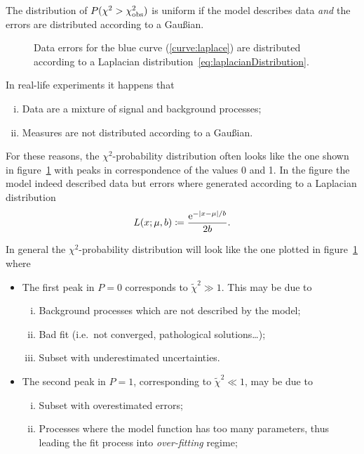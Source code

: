 The distribution of $P(\chi^2 > \chi^2_\textup{obs})$ is uniform if the model describes data \emph{and} the errors are distributed according to a Gau\ss{}ian.
\begin{figure}
	\centering
	\caption{Data errors for the blue curve (\ref{curve:laplace}) are distributed according to a Laplacian distribution~\eqref{eq:laplacianDistribution}.}
	\label{fig:chiSquareProbNonFlat}
\end{figure}
In real-life experiments it happens that
\begin{enumerate}[i.]
	\item
		Data are a mixture of signal and background processes;
	\item
		Measures are not distributed according to a Gau\ss{}ian.
\end{enumerate}
For these reasons, the $\chi^2$-probability distribution often looks like the one shown in figure~\ref{fig:chiSquareProbNonFlat} with peaks in correspondence of the values \num{0} and \num{1}.
In the figure the model indeed described data but errors where generated according to a Laplacian distribution
\begin{equation}\label{eq:laplacianDistribution}
	L(x;\mu,b) \coloneqq \frac{\mathrm{e}^{-\lvert x-\mu\rvert/b}}{2b}.
\end{equation}



In general the $\chi^2$-probability distribution will look like the one plotted in figure~\ref{fig:chiSquareProbNonFlat} where
\begin{itemize}
	\item
		The first peak in $P = 0$ corresponds to $\tilde\chi^2\gg1$.
		This may be due to
		\begin{enumerate}[i)]
			\item
				Background processes which are not described by the model;
			\item
				Bad fit (i.e.~not converged, pathological solutions\dots);
			\item
				Subset with underestimated uncertainties.
		\end{enumerate}
	\item
		The second peak in $P=1$, corresponding to $\tilde\chi^2\ll1$, may be due to
		\begin{enumerate}[i)]
			\item
				Subset with overestimated errors;
			\item
				Processes where the model function has too many parameters, thus leading the fit process into \emph{over-fitting} regime;
		\end{enumerate}
\end{itemize}



